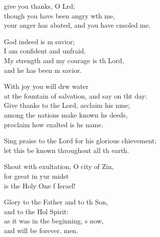\begin{psalmverse}
  \begin{patverse}
     give you thanks, O Lrd;\Flex\\
though you have been angry w\pointup{\i}th me,\Med\\
your anger has abated, and you have cnsoled me.

God indeed is m savior;\Med\\
I am confident and unfraid.\\
My strength and my courage is th Lord,\Med\\
and he has been m savior.

With joy you will drw water\Med\\
at the fountain of salvation, and say on tht day:\\
Give thanks to the Lord, acclaim his nme;\Flex\\
among the nations make known h\pointup{\i}s deeds,\Med\\
proclaim how exalted is h\pointup{\i}s name.

Sing praise to the Lord for his glorious chievement;\Med\\
let this be known throughout all th earth.

Shout with exultation, O city of Zin,\Flex\\
for great in yur midst\Med\\
is the Holy One f Israel!

Glory to the Father and to th Son,\Med\\
and to the Hol Spirit:\\
as it was in the beginning, \pointup{\i}s now,\Med\\
and will be forever. men. 
  \end{patverse}
\end{psalmverse}
